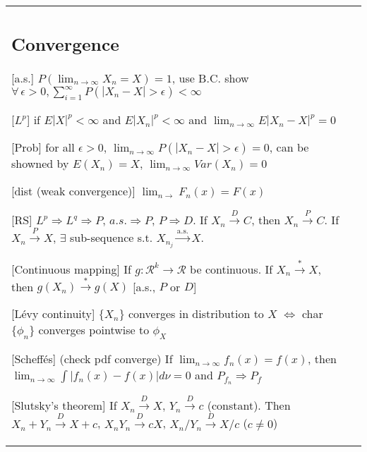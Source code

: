 \begin{tabulary}{\textwidth}{l || L}
	\subsection{Convergence}

	[a.s.]
	$ P\left(\lim_{n\rightarrow\infty} X_n = X\right) = 1 $,
	use B.C. show $\forall \, \epsilon > 0, \sum_{i=1}^\infty P(|X_n - X| > \epsilon) < \infty$

	[$L^p$]
	if $E|X|^p<\infty$ and $E|X_n|^p<\infty$ and
	$ \lim_{n\rightarrow\infty} E|X_n-X|^p = 0 $

	[Prob]
	for all $\epsilon>0$,
	$
		\lim_{n\rightarrow\infty} P(|X_n-X|>\epsilon) = 0
	$,
	can be showned by $E(X_n)=X$, $\lim_{n\rightarrow\infty}Var(X_n) = 0$

	[dist (weak convergence)]
	$
		\lim_{n\rightarrow} F_n(x) = F(x)
	$

	[RS]
	$L^p\Rightarrow L^q\Rightarrow P$, $a.s. \Rightarrow P$, $P \Rightarrow D$.
	If $X_n\xrightarrow{D} C$, then $X_n \xrightarrow{P} C$.
	If $X_n\xrightarrow{P} X$, $\exists$ sub-sequence s.t. $X_{n_j}\xrightarrow{\text{a.s.}}X$.

		[Continuous mapping]
	If $g: \mathcal{R}^k\rightarrow\mathcal{R}$ be continuous.
	If $X_n \xrightarrow{\text{*}} X$, then $g(X_n) \xrightarrow{\text{*}}g(X)$
	[a.s., $P$ or $D$]





	[Lévy continuity]
	$\{X_n\}$ converges in distribution to $X$  $\Leftrightarrow$ char $\{\phi_n\}$ converges pointwise to $\phi_X$

	[Scheffés] (check pdf converge)
	If $\lim_{n\rightarrow\infty} f_n(x)=f(x)$,
	then $\lim_{n\rightarrow\infty} \int |f_n(x) - f(x)|d\nu=0$ and
	$P_{f_n} \Rightarrow P_f$

	[Slutsky's theorem]
	If $X_n\xrightarrow{D} X$, $Y_n \xrightarrow{D} c$ (constant).
	Then $X_n + Y_n \xrightarrow{D} X + c$,\;
	$X_nY_n \xrightarrow{D} cX$, $X_n/Y_n \xrightarrow{D} X/c$ ($c\neq0$)


\end{tabulary}

